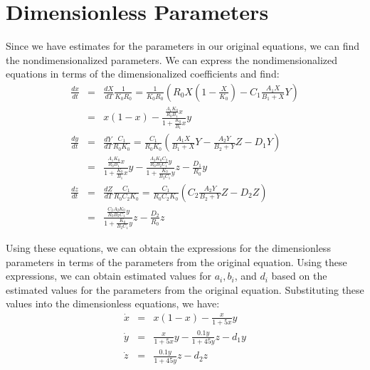 \documentclass{article}
\begin{document}
\section{Dimensionless Parameters}

Since we have estimates for the parameters in our original equations, we can find the nondimensionalized parameters. We can express the nondimensionalized equations in terms of the dimensionalized coefficients and find:
\begin{eqnarray}
\frac{dx}{dt} &=& \frac{dX}{dT} \frac{1}{K_0 R_0} = \frac{1}{K_0 R_0} \left( R_0 X \left(1 - \frac{X}{K_0} \right) - C_1 \frac{A_1 X}{B_1 + X} Y \right) \nonumber \\
&=& x(1-x) - \frac{\frac{A_1 K_0}{R_0 B_1} x}{1 + \frac{K_0}{B_1} x} y \\
\frac{dy}{dt} &=& \frac{dY}{dT} \frac{C_1}{R_0 K_0} = \frac{C_1}{R_0 K_0} \left( \frac{A_1 X}{B_1 + X} Y - \frac{A_2 Y}{B_2 + Y} Z - D_1 Y \right) \nonumber \\
&=& \frac{ \frac{A_1 K_0}{R_0 B_1} x}{1 + \frac{K_0}{B_1} x} y - \frac{\frac{A_2 K_0 C_2}{R_0 B_2 C_1}y}{1 + \frac{K_0}{B_2 C_1} y } z - \frac{D_1}{R_0} y \\
\frac{dz}{dt} &=& \frac{dZ}{dT} \frac{C_1}{R_0 C_2 K_0} = \frac{C_1}{R_0 C_2 K_0} \left( C_2 \frac{A_2 Y}{B_2 + Y} Z - D_2 Z \right) \nonumber \\
&=& \frac{ \frac{C_2 A_2 K_0}{R_0 B_2 C_1} y}{1 + \frac{ K_0}{B_2 C_1} y} z - \frac{D_2}{R_0} z  
\end{eqnarray}

Using these equations, we can obtain the expressions for the dimensionless parameters in terms of the parameters from the original equation. Using these expressions, we can obtain estimated values for $a_i, b_i$, and $d_i$ based on the estimated values for the parameters from the original equation. Substituting these values into the dimensionless equations, we have:
\begin{eqnarray}
\dot{x} &=& x(1-x) - \frac{x }{1 + 5 x}y \\
\dot{y} &=& \frac{x}{1 + 5 x} y - \frac{0.1 y}{1 + 45 y} z - d_1 y \\
\dot{z} &=& \frac{0.1 y}{1 + 45 y} z - d_2 z
\end{eqnarray}
\end{document}
